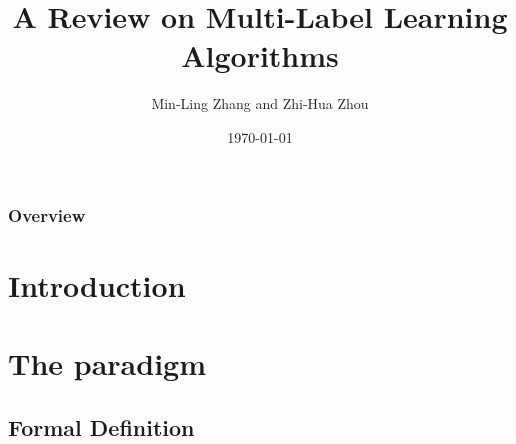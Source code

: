 \documentclass{beamer}
\title[Large-Scale Data Analysis Techniques]{A Review on Multi-Label Learning Algorithms} %
\author[Sissy Themeli, Nikiforos Pittaras]{Min-Ling Zhang and Zhi-Hua Zhou} %
\institute[DI-UOA] %
{
IEEE TRANSACTIONS ON KNOWLEDGE AND DATA ENGINEERING\\ %
\medskip
}
\date{\today} %
\begin{document}
\begin{frame}
\titlepage %
\end{frame}

\begin{frame}
\frametitle{Overview} %
\tableofcontents %
\end{frame}


\section{Introduction} %
\section{The paradigm}
\subsection{Formal Definition} %
\end{document}

